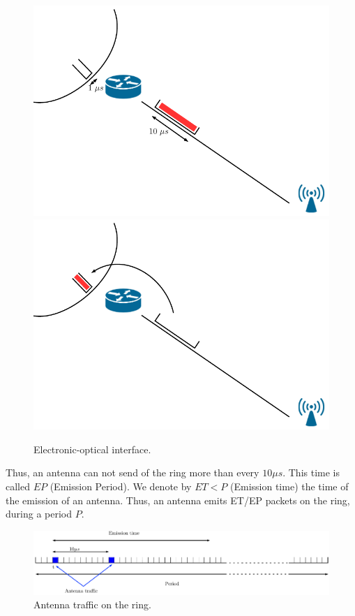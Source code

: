 \documentclass[a4paper,10pt]{article}
\begin{document}
        \begin{figure}[h!]
\begin{center}   

      \includegraphics[scale=0.3]{slot1.pdf}
  \includegraphics[scale=0.3]{slot2.pdf}
     \caption{Electronic-optical interface.}
     
\end{center}
  \end{figure}
    Thus, an antenna can not send of the ring more than every $10\mu s$. This time is called $EP$ (Emission Period).
    We denote by $ET<P$ (Emission time) the time of the emission of an antenna. Thus, an antenna emits ET/EP packets on the ring, during a period $P$.
    	    
        \begin{figure}[h!]
\begin{center}   

      \includegraphics[width=\textwidth]{emission_antenna.pdf}
     \caption{Antenna traffic on the ring.}
  
\end{center}
  \end{figure}
\end{document}
